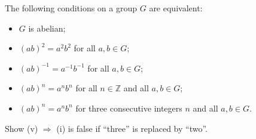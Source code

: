 The following conditions on a group \(G\) are equivalent:
\begin{itemize}
    \item[(i)] \(G\) is abelian;
    \item[(ii)] $(ab)^2 = a^2b^2$ for all $a,b\in G$;
    \item[(iii)] $(ab)^{-1} = a^{-1}b^{-1}$ for all $a, b\in G$;
    \item[(iv)] $(ab)^n = a^nb^n$ for all $n\in \mathbb{Z}$ and all $a,b\in G$;
    \item[(v)] $(ab)^n = a^nb^n$ for three consecutive integers $n$ and all $a, b\in G$.
\end{itemize}
Show (v) $\Rightarrow$ (i) is false if ``three'' is replaced by ``two''.